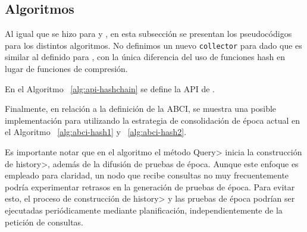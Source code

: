 \subsection{Algoritmos}\label{subsubsec:details}

Al igual que se hizo para \vanilla y \compresschain, en esta subsección se presentan los pseudocódigos
para los distintos algoritmos. No definimos un nuevo \texttt{collector} para \hashchain dado que
es similar al definido
para \compresschain, con la única diferencia del uso de funciones hash en lugar de funciones de compresión.

En el Algoritmo ~\ref{alg:api-hashchain} se define la API de \setchain.




Finalmente, en relación a la definición de la ABCI, se muestra una posible implementación para
\hashchain utilizando la estrategia de consolidación de época actual en el Algoritmo ~\ref{alg:abci-hash1}
y ~\ref{alg:abci-hash2}.

Es importante notar que en el algoritmo el método \<Query> inicia la construcción de \<history>, además de
la difusión de pruebas de época.
%
Aunque este enfoque es empleado para claridad, un nodo que recibe consultas
no muy frecuentemente podría experimentar retrasos en la generación de pruebas de época.
%
Para evitar esto, el proceso de construcción de \<history> y las pruebas de época podrían ser ejecutadas
periódicamente mediante planificación, independientemente de la petición de consultas.

